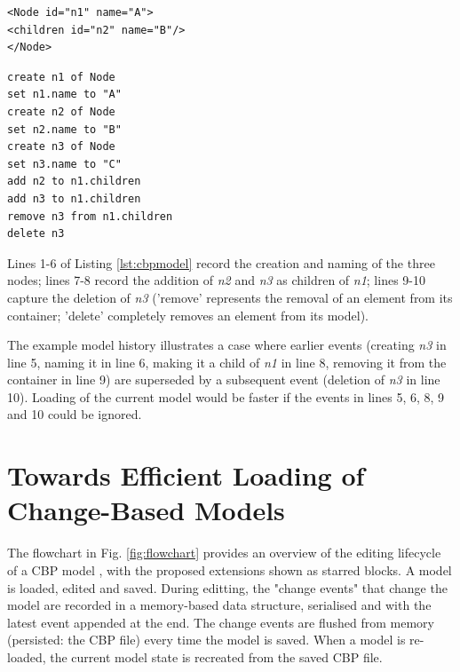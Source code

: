 \documentclass{llncs}
\begin{document}
    \noindent
    \begin{minipage}[t]{0.5\linewidth}
\begin{lstlisting}[style=xmi,caption={State-based tree model.},label=lst:xmimodel]
<Node id="n1" name="A">
<children id="n2" name="B"/>
</Node>
\end{lstlisting}
    \end{minipage}
    \hfill
    \begin{minipage}[t]{0.5\linewidth}
\begin{lstlisting}[style=eol,caption={Change-based tree model.},label=lst:cbpmodel]
create n1 of Node
set n1.name to "A"      
create n2 of Node
set n2.name to "B"      
create n3 of Node
set n3.name to "C"      
add n2 to n1.children   
add n3 to n1.children
remove n3 from n1.children   
delete n3
\end{lstlisting}
    \end{minipage}
    
    Lines 1-6 of Listing \ref{lst:cbpmodel} 
    record the creation and naming of the three nodes; lines 7-8 record the addition of \emph{n2} and \emph{n3} as children of \emph{n1}; lines 9-10 capture the deletion of \emph{n3} ('remove'   represents the removal of an element from its container; 'delete' completely removes an element from its model).
    
    The example model history illustrates a case where  earlier events (creating \emph{n3} in line 5, naming it in line 6, making it a child of \emph{n1} in line 8, removing it from the container in line 9) are superseded by a subsequent event (deletion of \emph{n3} in line 10).  Loading of the current model would be faster if the events in lines 5, 6, 8, 9 and 10 could be ignored.
    
    \section{Towards Efficient Loading of Change-Based Models}
    \label{sec:loading_time_optimisation}
    The flowchart in Fig. \ref{fig:flowchart} provides an overview of the editing lifecycle of a CBP model \cite{yohannis2017turning}, with the proposed extensions shown as starred blocks.  A model is loaded, edited and saved.  During editting, the "change events" that change the model are recorded in a memory-based data structure, serialised and with the latest event appended at the end.  The change events are flushed from memory (persisted: the CBP file) every time the model is saved.  When a model is re-loaded, the current model state is recreated from the saved CBP file.
    
\end{document}
